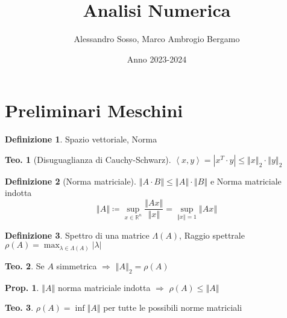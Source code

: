 \documentclass[a4paper,10pt]{article}
\theoremstyle{definition}
\theoremstyle{indentdefinition}
\newtheorem{defn}{Definizione}[section]
\theoremstyle{indenttheorem}
\newtheorem{thm}{Teo.}
\newtheorem{prop}{Prop.}
\theoremstyle{myremark}
\theoremstyle{indentgeneral}
\theoremstyle{plain}
\theoremstyle{plain}
\newenvironment{myboxed} 
{\noindent\begin{lrbox}{\mybox}\begin{minipage}{\textwidth}}
{\end{minipage}\end{lrbox}\fbox{\usebox{\mybox}}}
\begin{document}
\title{\textbf{Analisi Numerica}}
\author{Alessandro Sosso, Marco Ambrogio Bergamo}
\date{Anno 2023-2024}

\maketitle
\tableofcontents{}

\section*{Preliminari Meschini}
\begin{defn}
Spazio vettoriale, Norma
\end{defn}

\begin{thm}[Disuguaglianza di Cauchy-Schwarz]
$\left\langle x,y\right\rangle =\left|x^{T}\cdot y\right|\leq\left\Vert x\right\Vert _{2}\cdot\left\Vert y\right\Vert _{2}$
\end{thm}

\begin{defn}[Norma matriciale]
 $\left\Vert A\cdot B\right\Vert \leq\left\Vert A\right\Vert \cdot\left\Vert B\right\Vert $
e Norma matriciale indotta $$\left\Vert A\right\Vert \coloneqq\sup_{x\in\mathbb{R}^{n}}\frac{\left\Vert Ax\right\Vert }{\left\Vert x\right\Vert }=\sup_{\left\Vert x\right\Vert =1}\left\Vert Ax\right\Vert $$
\end{defn}

\begin{defn}
Spettro di una matrice $\Lambda\left(A\right)$, Raggio spettrale
$\rho\left(A\right)=\max_{\lambda\in\Lambda\left(A\right)}\left|\lambda\right|$
\end{defn}

\begin{thm}
Se $A$ simmetrica $\Longrightarrow$ $\left\Vert A\right\Vert _{2}=\rho\left(A\right)$
\end{thm}

\begin{prop}
\textup{$\left\Vert A\right\Vert $} norma matriciale indotta $\Longrightarrow$
$\rho\left(A\right)\leq\left\Vert A\right\Vert $
\end{prop}

\begin{myboxed}
\begin{thm}
$\rho\left(A\right)=\inf\left\Vert A\right\Vert $ per tutte le possibili
norme matriciali
\end{thm}
\end{myboxed}
\end{document}
